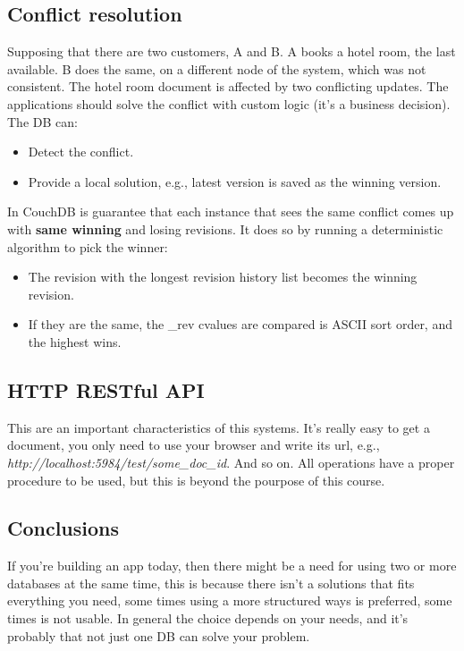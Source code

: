 \documentclass[12pt]{article}
\begin{document}
\subsection{Conflict resolution}
Supposing that there are two customers, A and B. A books a hotel room, the last available. B does the same, on a different node of the system, which was not consistent. The hotel room document is affected by two conflicting updates. The applications should solve the conflict with custom logic (it's a business decision). The DB can:
\begin{itemize}
  \item Detect the conflict.
  \item Provide a local solution, e.g., latest version is saved as the winning version.
\end{itemize}
In CouchDB is guarantee that each instance that sees the same conflict comes up with \textbf{same winning} and losing revisions. It does so by running a deterministic algorithm to pick the winner:
\begin{itemize}
  \item The revision with the longest revision history list becomes the winning revision.
  \item If they are the same, the \_rev cvalues are compared is ASCII sort order, and the highest wins.
\end{itemize}

\subsection{HTTP RESTful API}
This are an important characteristics of this systems. It's really easy to get a document, you only need to use your browser and write its url, e.g., \textit{http://localhost:5984/test/some\_doc\_id}. And so on. All operations have a proper procedure to be used, but this is beyond the pourpose of this course.

\subsection{Conclusions} If you're building an app today, then there might be a need for using two or more databases at the same time, this is because there isn't a solutions that fits everything you need, some times using a more structured ways is preferred, some times is not usable. In general the choice depends on your needs, and it's probably that not just one DB can solve your problem.

\clearpage
\end{document}
